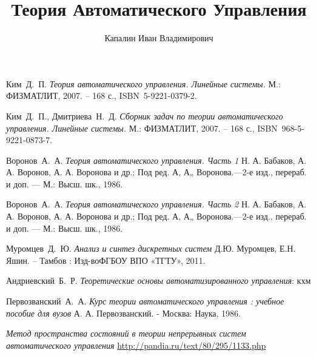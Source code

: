 \documentclass[          %
                openany, %
                twoside, %
                a5paper, %
                9pt      %
              ]{extbook}
\title{Теория Автоматического Управления}
\author{Капалин Иван Владимирович}
\date{}
\theoremstyle{plain}
\theoremstyle{definition}
\theoremstyle{remark}
\theoremstyle{plain}
\begin{document}
    \maketitle
    \setcounter{page}{4}

    \tableofcontents

    \cleardoublepage

    

    
    
    
    
    

    \begin{thebibliography}{0}
         Ким~Д.~П.
        \emph{Теория автоматического управления. Линейные системы.} М.: ФИЗМАТЛИТ, 2007. – 168 с., ISBN~5-9221-0379-2.

         Ким~Д.~П., Дмитриева~Н.~Д.
        \emph{Сборник задач по теории автоматического управления. Линейные системы.} М.: ФИЗМАТЛИТ, 2007. – 168 с., ISBN~968-5-9221-0873-7.

         Воронов~А.~А.
        \emph{Теория автоматического управления. Часть 1} Н. А. Бабаков, А. А. Воронов, А. А. Воронова и др.; Под ред. А, А„ Воронова.—2-е изд., перераб. и доп. — М.: Высш. шк., 1986.

         Воронов~А.~А.
        \emph{Теория автоматического управления. Часть 2} Н. А. Бабаков, А. А. Воронов, А. А. Воронова и др.; Под ред. А, А„ Воронова.—2-е изд., перераб. и доп. — М.: Высш. шк., 1986.

         Муромцев~Д.~Ю.
        \emph{Анализ и синтез дискретных систем} Д.Ю. Муромцев, Е.Н. Яшин. – Тамбов : Изд-воФГБОУ ВПО «ТГТУ», 2011.

         Андриевский~Б.~Р.
        \emph{Теоретические основы автоматизированного управления}: кхм

         Первозванский~А.~А.
        \emph{Курс теории автоматического управления : учебное пособие для вузов} А. А. Первозванский. - Москва: Наука, 1986.

        \emph{Метод пространства состояний в теории непрерывных систем автоматического управления} \url{http://pandia.ru/text/80/295/1133.php}

    \end{thebibliography}
\end{document}
